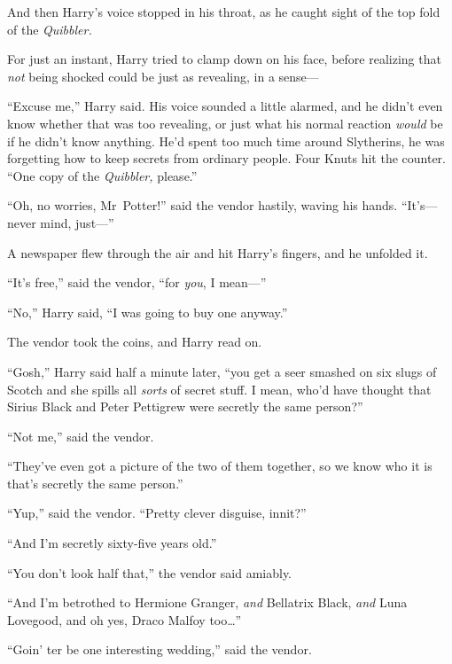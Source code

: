 And then Harry’s voice stopped in his throat, as he caught sight of the top fold of the \emph{Quibbler.}


For just an instant, Harry tried to clamp down on his face, before realizing that \emph{not} being shocked could be just as revealing, in a sense—

“Excuse me,” Harry said. His voice sounded a little alarmed, and he didn’t even know whether that was too revealing, or just what his normal reaction \emph{would} be if he didn’t know anything. He’d spent too much time around Slytherins, he was forgetting how to keep secrets from ordinary people. Four Knuts hit the counter. “One copy of the \emph{Quibbler,} please.”

“Oh, no worries, Mr~Potter!” said the vendor hastily, waving his hands. “It’s—never mind, just—”

A newspaper flew through the air and hit Harry’s fingers, and he unfolded it.


“It’s free,” said the vendor, “for \emph{you}, I mean—”

“No,” Harry said, “I was going to buy one anyway.”

The vendor took the coins, and Harry read on.

“Gosh,” Harry said half a minute later, “you get a seer smashed on six slugs of Scotch and she spills all \emph{sorts} of secret stuff. I mean, who’d have thought that Sirius Black and Peter Pettigrew were secretly the same person?”

“Not me,” said the vendor.

“They’ve even got a picture of the two of them together, so we know who it is that’s secretly the same person.”

“Yup,” said the vendor. “Pretty clever disguise, innit?”

“And I’m secretly sixty-five years old.”

“You don’t look half that,” the vendor said amiably.

“And I’m betrothed to Hermione Granger, \emph{and} Bellatrix Black, \emph{and} Luna Lovegood, and oh yes, Draco Malfoy too…”

“Goin’ ter be one interesting wedding,” said the vendor.

